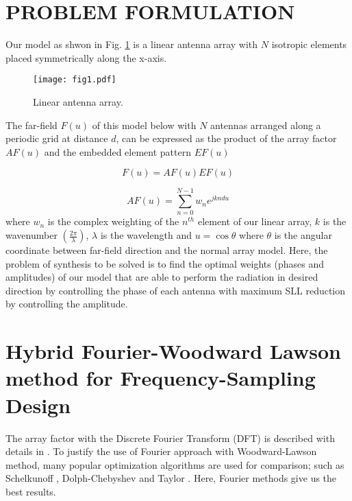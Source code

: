 \documentclass[conference]{IEEEtran}
\begin{document}
\section{PROBLEM FORMULATION}
Our model as shwon in Fig. \ref{fig1} is a linear antenna array with $N$ isotropic elements placed symmetrically along the x-axis.
\begin{figure} [!ht]
\centerline{\texttt{[image: fig1.pdf]}}
\caption{Linear antenna array.}
\label{fig1}
\end{figure}
The far-field $F\left( u \right)$ of this model below with $N$ antennas arranged along a periodic grid at distance $d$, can be expressed as the product of the array factor $AF\left( u \right)$ and the embedded element pattern $EF\left( u \right)$    

\begin{equation}
F\left( u \right) = AF\left( u \right)EF\left( u \right)
\label{equ1}
\end{equation}

\begin{equation}
AF\left( u \right) = \sum\limits_{n = 0}^{N - 1} {w_n } e^{jkndu}
\label{equ2}
\end{equation}
where {$w_n$ is the complex weighting of the $n^{th}$ element of our linear array}, {$k$ is the wavenumber $\left( {\frac{{2\pi }}{\lambda }} \right)$}, {$\lambda $ is the wavelength} and {$u = \cos \theta$ where $\theta$ is the angular coordinate between far-field direction and the normal array model.} Here, the problem of synthesis to be solved is to find the optimal weights (phases and amplitudes) of our model that are able to perform the radiation in desired direction by controlling the phase of each antenna with maximum SLL reduction by controlling the amplitude.


\section{Hybrid Fourier-Woodward Lawson method for Frequency-Sampling Design}

The array factor with the Discrete Fourier Transform (DFT) is described with details in \cite{article27}. To justify the use of Fourier approach with Woodward-Lawson method, many popular optimization algorithms are used for comparison; such as Schelkunoff \cite{article26}, Dolph-Chebyshev  and Taylor \cite{article24}. Here, Fourier methods give us the best results. 

\begin{figure} [!ht]
\end{figure}
\end{document}
